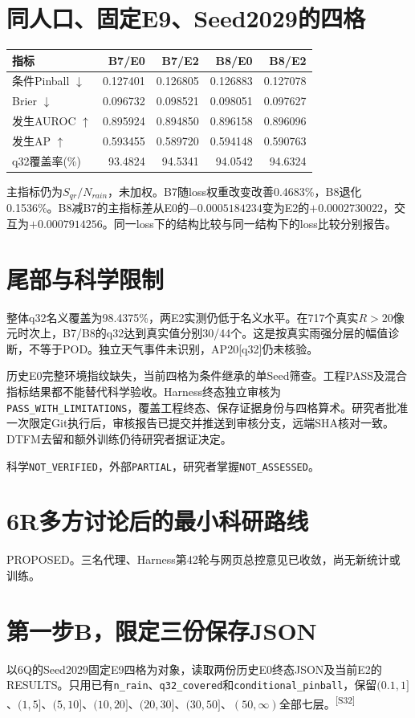 \documentclass[UTF8,10.5pt,a4paper,fontset=none]{ctexart}
\newcommand{\evi}[1]{\textsuperscript{\color{muted}[#1]}}
\newcommand{\pageheading}[2]{\clearpage\section*{#1}\textcolor{muted}{#2}\par\vspace{3pt}}
\begin{document}
\section*{同人口、固定E9、Seed2029的四格}
\begin{tabularx}{\textwidth}{@{}lrrrr@{}}
\toprule 指标 & B7/E0 & B7/E2 & B8/E0 & B8/E2\\\midrule
条件Pinball $\downarrow$ & 0.127401 & 0.126805 & 0.126883 & 0.127078\\
Brier $\downarrow$ & 0.096732 & 0.098521 & 0.098051 & 0.097627\\
发生AUROC $\uparrow$ & 0.895924 & 0.894850 & 0.896158 & 0.896096\\
发生AP $\uparrow$ & 0.593455 & 0.589720 & 0.594148 & 0.590763\\
q32覆盖率(\%) & 93.4824 & 94.5341 & 94.0542 & 94.6324\\
\bottomrule
\end{tabularx}

主指标仍为$S_{qr}/N_{rain}$，未加权。B7随loss权重改变改善0.4683\%，B8退化0.1536\%。B8减B7的主指标差从E0的$-0.0005184234$变为E2的$+0.0002730022$，交互为$+0.0007914256$。同一loss下的结构比较与同一结构下的loss比较分别报告。

\section*{尾部与科学限制}
整体q32名义覆盖为98.4375\%，两E2实测仍低于名义水平。在717个真实$R>20$像元时次上，B7/B8的q32达到真实值分别30/44个。这是按真实雨强分层的幅值诊断，不等于POD。独立天气事件未识别，AP20[q32]仍未核验。

历史E0完整环境指纹缺失，当前四格为条件继承的单Seed筛查。工程PASS及混合指标结果都不能替代科学验收。Harness终态独立审核为\texttt{PASS\_WITH\_LIMITATIONS}，覆盖工程终态、保存证据身份与四格算术。研究者批准一次限定Git执行后，审核报告已提交并推送到审核分支，远端SHA核对一致。DTFM去留和额外训练仍待研究者据证决定。

科学\texttt{NOT\_VERIFIED}，外部\texttt{PARTIAL}，研究者掌握\texttt{NOT\_ASSESSED}。

\pageheading{6R\quad 多方讨论后的最小科研路线}{PROPOSED。三名代理、Harness第42轮与网页总控意见已收敛，尚无新统计或训练。}
\section*{第一步B，限定三份保存JSON}
以6Q的Seed2029固定E9四格为对象，读取两份历史E0终态JSON及当前E2的RESULTS。只用已有\texttt{n\_rain}、\texttt{q32\_covered}和\texttt{conditional\_pinball}，保留$(0.1,1]$、$(1,5]$、$(5,10]$、$(10,20]$、$(20,30]$、$(30,50]$、$(50,\infty)$全部七层。\evi{S32}
\end{document}
